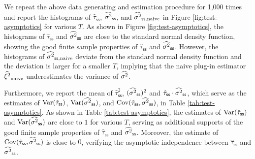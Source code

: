We repeat the above data generating and estimation procedure for 1,000 times and report the histograms of $\hat{\tau}_{\mathsf{ss}}$, $\widehat{\sigma^2}_{\mathsf{ss}}$, and $\widehat{\sigma^2}_{\mathsf{ss},\mathrm{naive}}$ in Figure \ref{fig:test-asymptotics} for various $T$.  As shown in Figure \ref{fig:test-asymptotics}, the histograms of $\hat{\tau}_{\mathsf{ss}}$ and  $\widehat{\sigma^2}_{\mathsf{ss}}$ are close to the standard normal density function, showing the good finite sample properties of $\hat{\tau}_{\mathsf{ss}}$ and  $\widehat{\sigma^2}_{\mathsf{ss}}$. However, the histograms of $\widehat{\sigma^2}_{\mathsf{ss},\mathrm{naive}} $ deviate from the standard normal density function and the deviation is larger for a smaller $T$, implying that the naive plug-in estimator $\widehat{\xi^2}_{\mathrm{naive}}$ underestimates the variance of $\widehat{\sigma^2}$. 

Furthermore, we report the mean of $\hat{\tau}_{\mathsf{ss}}^2 $, $(\widehat{\sigma^2}_{\mathsf{ss}})^2$ and $\hat{\tau}_{\mathsf{ss}} \cdot \widehat{\sigma^2}_{\mathsf{ss}}$, which serve as the estimates of $\mathrm{Var}(\hat{\tau}_{\mathsf{ss}})$, $\mathrm{Var}(\widehat{\sigma^2}_{\mathsf{ss}})$, and $\mathrm{Cov}(\hat{\tau}_{\mathsf{ss}}, \widehat{\sigma^2}_{\mathsf{ss}})$, in Table \ref{tab:test-asymptotics}. As shown in Table \ref{tab:test-asymptotics}, the estimates of  $\mathrm{Var}(\hat{\tau}_{\mathsf{ss}})$ and $\mathrm{Var}(\widehat{\sigma^2}_{\mathsf{ss}})$ are close to $1$ for various $T$, serving as additional supports of the good finite sample properties of $\hat{\tau}_{\mathsf{ss}}$ and $\widehat{\sigma^2}_{\mathsf{ss}}$. Moreover, the estimate of $\mathrm{Cov}(\hat{\tau}_{\mathsf{ss}}, \widehat{\sigma^2}_{\mathsf{ss}})$ is close to $0$, verifying the asymptotic independence between $\hat{\tau}_{\mathsf{ss}}$ and $ \widehat{\sigma^2}_{\mathsf{ss}}$. 




